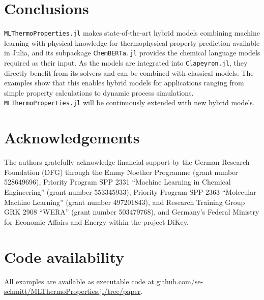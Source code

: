 \documentclass{juliacon}
\begin{document}
 

\section{Conclusions}

\texttt{MLThermoProperties.jl} makes state-of-the-art hybrid models combining machine learning with physical knowledge for thermophysical property prediction available in Julia, and its subpackage \texttt{ChemBERTa.jl} provides the chemical language models required as their input.
As the models are integrated into \texttt{Clapeyron.jl}, they directly benefit from its solvers and can be combined with classical models.
The examples show that this enables hybrid models for applications ranging from simple property calculations to dynamic process simulations.
\texttt{MLThermoProperties.jl} will be continuously extended with new hybrid models.

\section*{Acknowledgements}

The authors gratefully acknowledge financial support by the German Research Foundation (DFG) through the Emmy Noether Programme (grant number 528649696), Priority Program SPP 2331 ``Machine Learning in Chemical Engineering'' (grant number 553345933), Priority Program SPP 2363 ``Molecular Machine Learning'' (grant number 497201843), and Research Training Group GRK 2908 ``WERA'' (grant number 503479768), and Germany's Federal Ministry for Economic Affairs and Energy within the project DiKey.

\section*{Code availability}

All examples are available as executable code at \href{https://github.com/se-schmitt/MLThermoProperties.jl/tree/paper}{github.com/se-schmitt/MLThermoProperties.jl/tree/paper}.


\end{document}
